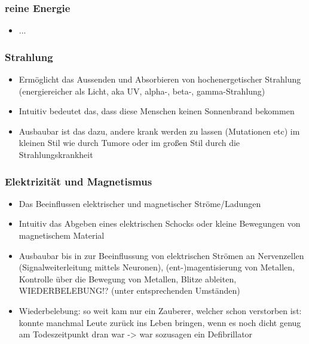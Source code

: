 \subsubsection{reine Energie}\label{sec:energiemagie}
\begin{itemize}
	\item ...
\end{itemize}

\subsubsection{Strahlung}\label{sec:strahlungsmagie}
\begin{itemize}
	\item Ermöglicht das Aussenden und Absorbieren von hochenergetischer Strahlung (energiereicher als Licht, aka UV, alpha-, beta-, gamma-Strahlung)
	\item Intuitiv bedeutet das, dass diese Menschen keinen Sonnenbrand bekommen
	\item Ausbaubar ist das dazu, andere krank werden zu lassen (Mutationen etc) im kleinen Stil wie durch Tumore oder im großen Stil durch die Strahlungskrankheit
\end{itemize}

\subsubsection{Elektrizität und Magnetismus}\label{sec:elektromagie}
\begin{itemize}
	\item Das Beeinflussen elektrischer und magnetischer Ströme/Ladungen
	\item Intuitiv das Abgeben eines elektrischen Schocks oder kleine Bewegungen von magnetischem Material
	\item Ausbaubar bis in zur Beeinflussung von elektrischen Strömen an Nervenzellen (Signalweiterleitung mittels Neuronen), (ent-)magentisierung von Metallen, Kontrolle über die Bewegung von Metallen, Blitze ableiten, WIEDERBELEBUNG!? (unter entsprechenden Umständen)
	\item Wiederbelebung: so weit kam nur ein Zauberer, welcher schon verstorben ist: konnte manchmal Leute zurück ins Leben bringen, wenn es noch dicht genug am Todeszeitpunkt dran war -> war sozusagen ein Defibrillator
\end{itemize}

